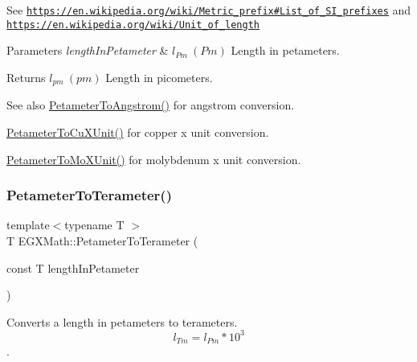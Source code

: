 See \href{https://en.wikipedia.org/wiki/Metric_prefix#List_of_SI_prefixes}{\tt https\+://en.\+wikipedia.\+org/wiki/\+Metric\+\_\+prefix\#\+List\+\_\+of\+\_\+\+S\+I\+\_\+prefixes} and \href{https://en.wikipedia.org/wiki/Unit_of_length}{\tt https\+://en.\+wikipedia.\+org/wiki/\+Unit\+\_\+of\+\_\+length} 
\begin{DoxyParams}{Parameters}
{\em length\+In\+Petameter} & $ l_{Pm}\ (Pm)$ Length in petameters. \\
\hline
\end{DoxyParams}
\begin{DoxyReturn}{Returns}
$ l_{pm}\ (pm)$ Length in picometers. 
\end{DoxyReturn}
\begin{DoxySeeAlso}{See also}
\mbox{\hyperlink{group___e_g_x_math-_conversions-_length_conversions-_petameter-_non-_s_i_ga2acc301b8b78a80d23a150da8cba3814}{Petameter\+To\+Angstrom()}} for angstrom conversion. 

\mbox{\hyperlink{group___e_g_x_math-_conversions-_length_conversions-_petameter-_non-_s_i_gad9b37964189c5963e4c634122fd763fe}{Petameter\+To\+Cu\+X\+Unit()}} for copper x unit conversion. 

\mbox{\hyperlink{group___e_g_x_math-_conversions-_length_conversions-_petameter-_non-_s_i_ga29419ba09bb33a7bc9e23f8cde2efea3}{Petameter\+To\+Mo\+X\+Unit()}} for molybdenum x unit conversion. 
\end{DoxySeeAlso}
\mbox{\label{group___e_g_x_math-_conversions-_length_conversions-_petameter-_s_i_ga49df669a2666aa9681c907ea80e4c34c}} 
\subsubsection{\texorpdfstring{Petameter\+To\+Terameter()}{PetameterToTerameter()}}
{\footnotesize\ttfamily template$<$typename T $>$ \\
T E\+G\+X\+Math\+::\+Petameter\+To\+Terameter (\begin{DoxyParamCaption}\item[{const T}]{length\+In\+Petameter }\end{DoxyParamCaption})}



Converts a length in petameters to terameters. \[ l_{Tm}=l_{Pm} * 10^{3} \]. 

